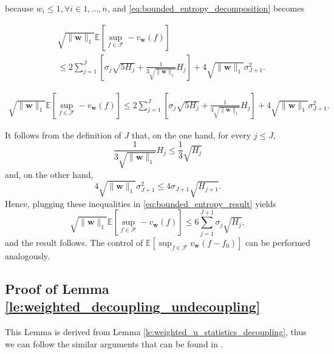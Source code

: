 \documentclass[letterpaper]{article} %
\def\DoubleColumn{}
\def\DoubleColumnEnd{}
\def\SingleColumn{}
\def\SingleColumnEnd{}
\newcommand{\E}{\mathbb{E}}
\newcommand{\weight}{\mathbf{w}}
\newcommand{\normo}[1]{\|#1\|_1}
\begin{document}
    \SingleColumnEnd
    because $w_i\le 1, \forall i\in 1,\dots,n$,
    and \eqref{eq:bounded_entropy_decomposition} becomes
    \DoubleColumn
    \begin{equation}
    \begin{aligned}
        \label{eq:bounded_entropy_result}
        &\sqrt{\normo{\weight{}}}\E[\sup_{f\in\mathcal{F}}-v_\weight(f)]\\
        &\le 2\sum_{j=1}^J[\sigma_j\sqrt{5H_j}+\frac{1}{3\sqrt{\normo{\weight{}}}}H_j]+4\sqrt{\normo{\weight{}}}\sigma_{J+1}^2.
    \end{aligned}
    \end{equation}
    \DoubleColumnEnd
    \SingleColumn
    \begin{equation}
    \begin{aligned}
        \label{eq:bounded_entropy_result}
        \sqrt{\normo{\weight{}}}\E[\sup_{f\in\mathcal{F}}-v_\weight(f)]\le 2\sum_{j=1}^J[\sigma_j\sqrt{5H_j}+\frac{1}{3\sqrt{\normo{\weight{}}}}H_j]+4\sqrt{\normo{\weight{}}}\sigma_{J+1}^2.
    \end{aligned}
    \end{equation}
    \SingleColumnEnd
    It follows from the definition of $J$ that, on the one hand, for every $j\le J$,
    \[\frac{1}{3\sqrt{\normo{\weight{}}}}H_j\le \frac{1}{3}\sqrt{H_j}\]
    and, on the other hand,
    \[4\sqrt{\normo{\weight{}}}\sigma_{J+1}^2\le 4\sigma_{J+1}\sqrt{H_{j+1}}.\]
    Hence, plugging these inequalities in \eqref{eq:bounded_entropy_result} yields
    \[\sqrt{\normo{\weight{}}}\E[\sup_{f\in\mathcal{F}}-v_\weight(f)]\le 6\sum_{j=1}^{J+1}\sigma_j\sqrt{H_j},\]
    and the result follows. The control of $\E[\sup_{f\in\mathcal{F}}v_\weight(f-f_0)]$ can be performed analogously.

\subsection{Proof of Lemma \ref{le:weighted_decoupling_undecoupling}} %
\label{sub:proof_of_lemma_le:weighted_decoupling_undecoupling}

    This Lemma is derived from Lemma \ref{le:weighted_u_statistics_decoupling}, thus we can follow the similar arguments that can be found in \cite{de2012decoupling}.
\end{document}
